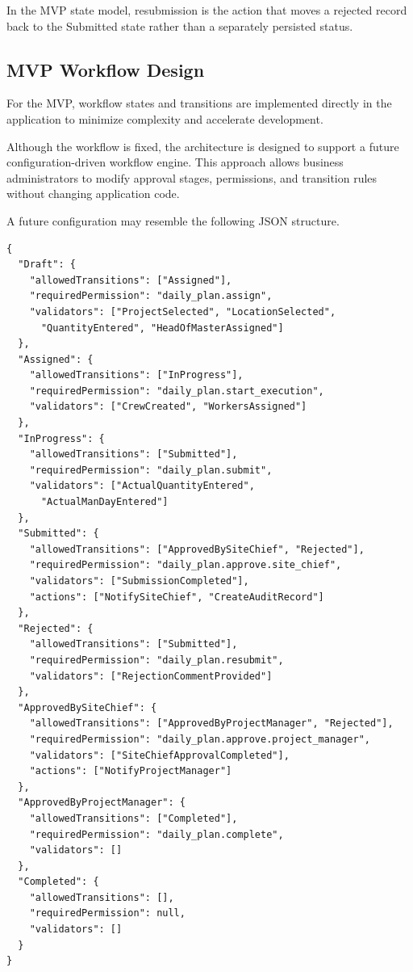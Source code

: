 \documentclass[11pt]{article}
\begin{document}
In the MVP state model, resubmission is the action that moves a rejected record
back to the Submitted state rather than a separately persisted status.

\normalsize
\clearpage
\subsection{MVP Workflow Design}

For the MVP, workflow states and transitions are implemented directly in the
application to minimize complexity and accelerate development.

Although the workflow is fixed, the architecture is designed to support a
future configuration-driven workflow engine. This approach allows business
administrators to modify approval stages, permissions, and transition rules
without changing application code.

A future configuration may resemble the following JSON structure.

\begin{lstlisting}[basicstyle=\ttfamily\scriptsize]
{
  "Draft": {
    "allowedTransitions": ["Assigned"],
    "requiredPermission": "daily_plan.assign",
    "validators": ["ProjectSelected", "LocationSelected",
      "QuantityEntered", "HeadOfMasterAssigned"]
  },
  "Assigned": {
    "allowedTransitions": ["InProgress"],
    "requiredPermission": "daily_plan.start_execution",
    "validators": ["CrewCreated", "WorkersAssigned"]
  },
  "InProgress": {
    "allowedTransitions": ["Submitted"],
    "requiredPermission": "daily_plan.submit",
    "validators": ["ActualQuantityEntered",
      "ActualManDayEntered"]
  },
  "Submitted": {
    "allowedTransitions": ["ApprovedBySiteChief", "Rejected"],
    "requiredPermission": "daily_plan.approve.site_chief",
    "validators": ["SubmissionCompleted"],
    "actions": ["NotifySiteChief", "CreateAuditRecord"]
  },
  "Rejected": {
    "allowedTransitions": ["Submitted"],
    "requiredPermission": "daily_plan.resubmit",
    "validators": ["RejectionCommentProvided"]
  },
  "ApprovedBySiteChief": {
    "allowedTransitions": ["ApprovedByProjectManager", "Rejected"],
    "requiredPermission": "daily_plan.approve.project_manager",
    "validators": ["SiteChiefApprovalCompleted"],
    "actions": ["NotifyProjectManager"]
  },
  "ApprovedByProjectManager": {
    "allowedTransitions": ["Completed"],
    "requiredPermission": "daily_plan.complete",
    "validators": []
  },
  "Completed": {
    "allowedTransitions": [],
    "requiredPermission": null,
    "validators": []
  }
}
\end{lstlisting}
\end{document}
